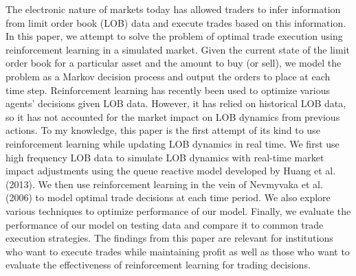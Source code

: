 The electronic nature of markets today has allowed traders to infer information from limit order book (LOB) data and execute trades based on this information. In this paper, we attempt to solve the problem of optimal trade execution using reinforcement learning in a simulated market. Given the current state of the limit order book for a particular asset and the amount to buy (or sell), we model the problem as a Markov decision process and output the orders to place at each time step. Reinforcement learning has recently been used to optimize various agents' decisions given LOB data. However, it has relied on historical LOB data, so it has not accounted for the market impact on LOB dynamics from previous actions. To my knowledge, this paper is the first attempt of its kind to use reinforcement learning while updating LOB dynamics in real time. We first use high frequency LOB data to simulate LOB dynamics with real-time market impact adjustments using the queue reactive model developed by Huang et al. (2013). We then use reinforcement learning in the vein of Nevmyvaka et al. (2006) to model optimal trade decisions at each time period. We also explore various techniques to optimize performance of our model. Finally, we evaluate the performance of our model on testing data and compare it to common trade execution strategies. The findings from this paper are relevant for institutions who want to execute trades while maintaining profit as well as those who want to evaluate the effectiveness of reinforcement learning for trading decisions.